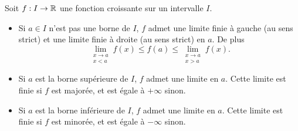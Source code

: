 \documentclass{magnolia}
\begin{document}
\begin{theoreme}[nom={Théorème de la limite monotone}]
Soit $f:I\to\mathbb{R}$ une fonction croissante sur un intervalle $I$.
\begin{itemize}
\item Si $a\in I$ n'est pas une borne de $I$, $f$ admet une limite finie 
  à gauche (au sens strict) et une limite finie à droite (au sens strict) en $a$. De plus
  \[\lim_{\substack{x\to a\\x<a}} f(x) \leq f(a) \leq
    \lim_{\substack{x\to a\\x>a}} f(x).\]
\item Si $a$ est la borne supérieure de $I$, $f$ admet une limite en $a$.
  Cette limite est finie si $f$ est majorée, et est égale à $+\infty$ sinon.
\item Si $a$ est la borne inférieure de $I$, $f$ admet une limite en $a$.
  Cette limite est finie si $f$ est minorée, et est égale à $-\infty$ sinon.
\end{itemize}
\end{theoreme}
\end{document}

